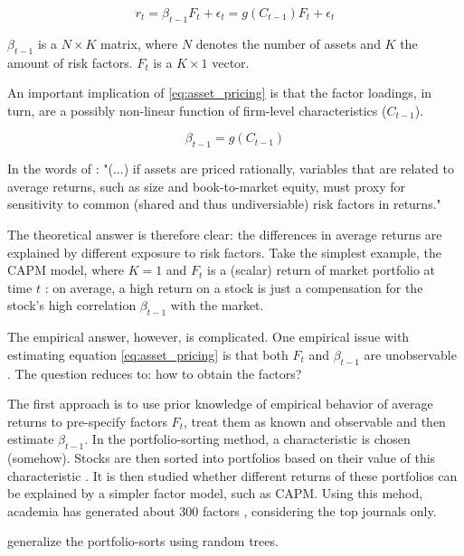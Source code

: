 		\begin{equation}
			r_t = \beta_{t-1}F_t + \epsilon_t  = g(C_{t-1})F_t + \epsilon_t \label{eq:asset_pricing}
		\end{equation}
	
		
		$\beta_{t-1}$ is a $N \times K$ matrix, where $N$ denotes the number of assets and $K$ the amount of risk factors. $F_t$ is a $K \times1 $ vector.
		
		An important implication of \ref{eq:asset_pricing} is that the factor loadings, in turn, are a possibly non-linear function of firm-level characteristics ($C_{t-1}$). 
			
		\begin{equation}
			\beta_{t-1}= g(C_{t-1})\label{eq:characteristics_as_proxies}
		\end{equation}
		
		In the words of \cite{fama1993common}: "(...) if assets are priced rationally, variables that are
		related to average returns, such as size and book-to-market equity, must proxy for
		sensitivity to common (shared and thus undiversiable) risk factors in returns." 	
		
		The theoretical answer is therefore clear: the differences in average returns are explained by different exposure to risk factors. 
		Take the simplest example, the CAPM model, where $K=1$ and $F_t$ is a (scalar) return of market portfolio at time $t$ \citep{cochrane2009asset}: on average, a high return on a stock is just a compensation for the stock's high correlation $\beta_{t-1}$ with the market. 
		
		The empirical answer, however, is complicated. One empirical issue with estimating equation \ref{eq:asset_pricing} is that both $F_t$ and $\beta_{t-1}$ are unobservable \citep{kelly2019characteristics}. The question reduces to: how to obtain the factors? 
		
		The first approach is to use prior knowledge of empirical behavior of average returns to pre-specify factors $F_t$, treat them as known and observable and then estimate $\beta_{t-1}$. In the portfolio-sorting method, a characteristic is chosen (somehow). Stocks are then sorted into portfolios based on their value of this characteristic \citep{fama1993common}. It is then studied whether different returns of these portfolios can be explained by a simpler factor model, such as CAPM. Using this mehod, academia has generated about 300 factors \citep{harvey2016and}, considering the top journals only.
		
		\cite{bryzgalova2019forest} generalize the portfolio-sorts using random trees.     
		
